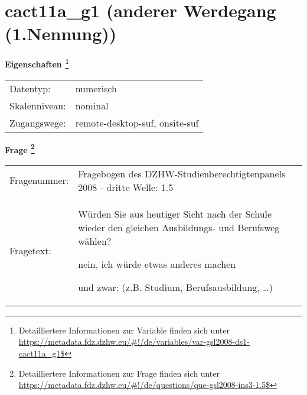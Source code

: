 
    \setcounter{footnote}{0}

    \vspace*{-1.8cm}
	\section{cact11a\_g1 (anderer Werdegang (1.Nennung))}
	\label{section:cact11a_g1}



    \vspace*{0.5cm}
    \noindent\textbf{Eigenschaften
	\footnote{Detailliertere Informationen zur Variable finden sich unter
		\url{https://metadata.fdz.dzhw.eu/\#!/de/variables/var-gsl2008-ds1-cact11a_g1$}}}\\
	\begin{tabularx}{\hsize}{@{}lX}
	Datentyp: & numerisch \\
	Skalenniveau: & nominal \\
	Zugangswege: &
	  remote-desktop-suf, 
	  onsite-suf
 \\
    \end{tabularx}



				\vspace*{0.5cm}
                \noindent\textbf{Frage
	                \footnote{Detailliertere Informationen zur Frage finden sich unter
		              \url{https://metadata.fdz.dzhw.eu/\#!/de/questions/que-gsl2008-ins3-1.5$}}}\\
				\begin{tabularx}{\hsize}{@{}lX}
					Fragenummer: &
					  Fragebogen des DZHW-Studienberechtigtenpanels 2008 - dritte Welle:
					  1.5
 \\
					Fragetext: & Würden Sie aus heutiger Sicht nach der Schule wieder den gleichen Ausbildungs- und Berufsweg wählen?\par  nein, ich würde etwas anderes machen\par  und zwar: (z.B. Studium, Berufsausbildung, …) \\
				\end{tabularx}





